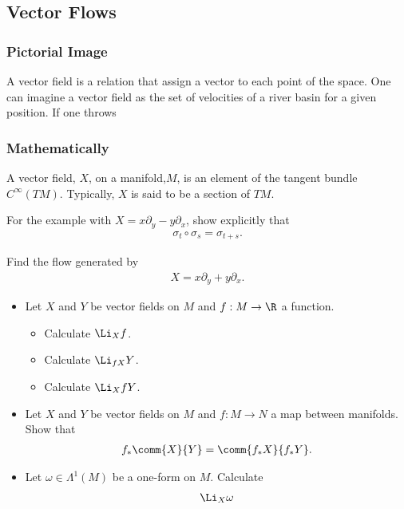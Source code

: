 \subsection{Vector Flows}

\subsubsection*{Pictorial Image}

A vector field is a relation that assign a vector to each point of the space. One can imagine a vector field as the set of velocities of a river basin for a given position. If one throws 

\subsubsection*{Mathematically}

A vector field, $X$,  on a manifold,$M$,  is an element of the tangent bundle$C^\infty(TM)$. Typically, $X$ is said to be a section of $TM$.


\begin{Ebox}
  For the example with $X=x\partial_y -y\partial_x$, show explicitly that 
  \begin{align}
    \sigma_t\circ \sigma_s = \sigma_{t+s}.
  \end{align}
\end{Ebox}


\begin{Ebox}
  Find the flow generated by
  \begin{align}
    X = x\partial_y +y\partial_x.
  \end{align}
\end{Ebox}

\begin{Ebox}
  \begin{itemize}
  \item Let $X$ and $Y$ be vector fields on $M$ and $f:M\to\R$ a function.
    \begin{itemize}
    \item Calculate $\Li_{X}f$.
    \item Calculate $\Li_{fX}Y$.
    \item Calculate $\Li_{X}fY$.
    \end{itemize}
  \item  Let $X$ and $Y$ be vector fields on $M$ and $f:M\to N$ a map between manifolds. Show that
    \begin{align}
      f_*\comm{X}{Y} =\comm{f_*X}{f_*Y}.
    \end{align}
  \item Let $\omega\in\Lambda^1(M)$ be a one-form on $M$. Calculate
    \begin{align}
      \Li_X \omega
    \end{align}
  \end{itemize}
\end{Ebox}

